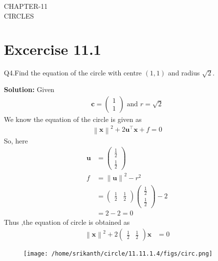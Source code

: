 \documentclass[12pt]{article}
\providecommand{\norm}[1]{\left\lVert#1\right\rVert}
\newcommand{\solution}{\noindent \textbf{Solution: }}
\newcommand{\myvec}[1]{\ensuremath{\begin{pmatrix}#1\end{pmatrix}}}
\let\vec\mathbf
\begin{document}
\begin{center}
\textbf\large{CHAPTER-11 \\ CIRCLES}

\end{center}
\section*{Excercise 11.1}

Q4.Find the equation of the circle with centre $(1,1)$ and radius $\sqrt{2}$.

\solution
Given
\begin{align}
	\vec{c} = \myvec{1\\1} \text{ and } r = \sqrt{2}
\end{align}
We know the equation of the circle is given as
\begin{align}
	\norm{\vec{x}}^{2} + 2\vec{u}^{\top}\vec{x} + f = 0
\end{align}
So, here
\begin{align}
	\vec{u} &= \myvec{\frac{1}{2}\\[2pt]\frac{1}{2}}\\
	f &= \norm{\vec{u}}^2 - r^2\\
	  &= \myvec{\frac{1}{2}&\frac{1}{2}}\myvec{\frac{1}{2}\\[2pt]\frac{1}{2}}-2\\
	  &=2-2=0	  
\end{align}
Thus ,the equation of circle is obtained as
\begin{align}
	\norm{\vec{x}}^2 + 2\myvec{\frac{1}{2}&\frac{1}{2}}\vec{x} &= 0       		       
\end{align}	
\begin{figure}[!h]
	\begin{center} 
	  \texttt{[image: /home/srikanth/circle/11.11.1.4/figs/circ.png]}
	\end{center}
\caption{}
\label{fig:Fig1}
\end{figure}
\end{document}
